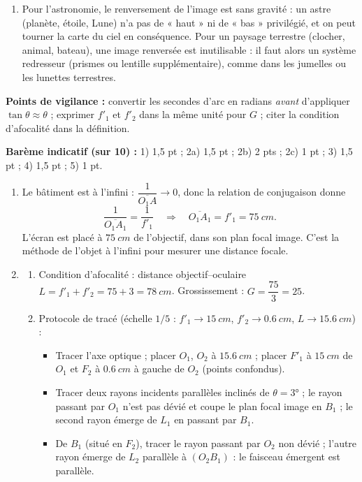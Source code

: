 \documentclass[11pt]{article}
\begin{document}
\begin{corrige}
\begin{enumerate}
\item Pour l'astronomie, le renversement de l'image est sans gravité : un astre (planète, étoile, Lune) n'a pas de « haut » ni de « bas » privilégié, et on peut tourner la carte du ciel en conséquence. Pour un paysage terrestre (clocher, animal, bateau), une image renversée est inutilisable : il faut alors un système redresseur (prismes ou lentille supplémentaire), comme dans les jumelles ou les lunettes terrestres.
\end{enumerate}
\textbf{Points de vigilance :} convertir les secondes d'arc en radians \emph{avant} d'appliquer $\tan\theta \approx \theta$ ; exprimer $f'_1$ et $f'_2$ dans la même unité pour $G$ ; citer la condition d'afocalité dans la définition.
\end{corrige}

\begin{corrige}
\textbf{Barème indicatif (sur 10) :} 1) 1,5 pt ; 2a) 1,5 pt ; 2b) 2 pts ; 2c) 1 pt ; 3) 1,5 pt ; 4) 1,5 pt ; 5) 1 pt.
\begin{enumerate}
\item Le bâtiment est à l'infini : $\dfrac{1}{\overline{O_1A}} \to 0$, donc la relation de conjugaison donne
\[ \dfrac{1}{\overline{O_1A_1}} = \dfrac{1}{f'_1} \quad \Longrightarrow \quad \overline{O_1A_1} = f'_1 = \SI{75}{cm}. \]
L'écran est placé à $\SI{75}{cm}$ de l'objectif, dans son plan focal image. C'est la méthode de l'objet à l'infini pour mesurer une distance focale.
\item 
\begin{enumerate}
\item[a)] Condition d'afocalité : distance objectif--oculaire $L = f'_1 + f'_2 = 75 + 3 = \SI{78}{cm}$. Grossissement : $G = \dfrac{75}{3} = 25$.
\item[b)] Protocole de tracé (échelle $1/5$ : $f'_1 \to \SI{15}{cm}$, $f'_2 \to \SI{0,6}{cm}$, $L \to \SI{15,6}{cm}$) :
\begin{itemize}
\item Tracer l'axe optique ; placer $O_1$, $O_2$ à $\SI{15,6}{cm}$ ; placer $F'_1$ à $\SI{15}{cm}$ de $O_1$ et $F_2$ à $\SI{0,6}{cm}$ à gauche de $O_2$ (points confondus).
\item Tracer deux rayons incidents parallèles inclinés de $\theta = 3°$ ; le rayon passant par $O_1$ n'est pas dévié et coupe le plan focal image en $B_1$ ; le second rayon émerge de $L_1$ en passant par $B_1$.
\item De $B_1$ (situé en $F_2$), tracer le rayon passant par $O_2$ non dévié ; l'autre rayon émerge de $L_2$ parallèle à $(O_2B_1)$ : le faisceau émergent est parallèle.

\end{itemize}
\end{enumerate}
\end{enumerate}
\end{corrige}
\end{document}

